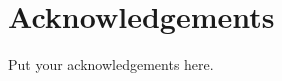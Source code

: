 



\bigskip


\begingroup

\let\clearpage\relax
\let\cleardoublepage\relax
\let\cleardoublepage\relax

\chapter*{Acknowledgements}

\noindent Put your acknowledgements here.\\



\endgroup